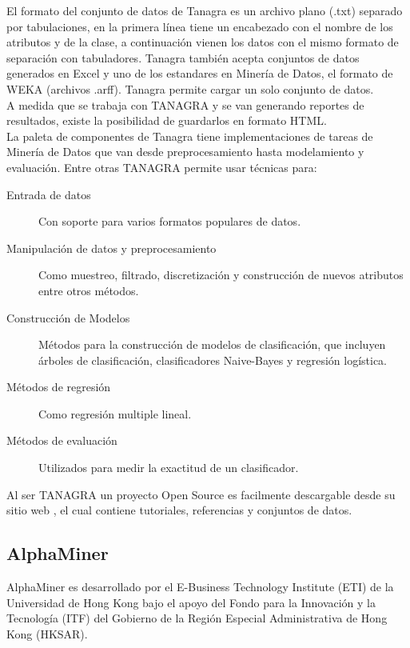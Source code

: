 El formato del conjunto de datos de Tanagra es un archivo plano (.txt) separado por tabulaciones, en la primera
l\'inea tiene un encabezado con el nombre de los atributos y de la clase, a continuaci\'on vienen los datos con
el mismo formato de separaci\'on con tabuladores. Tanagra tambi\'en acepta conjuntos de datos generados en Excel
y uno de los estandares en Miner\'ia de Datos, el formato de WEKA (archivos .arff). Tanagra permite cargar un
solo conjunto de datos.\\

A medida que se trabaja con TANAGRA y se van generando reportes de resultados, existe la posibilidad de
guardarlos en formato HTML.\\

La paleta de componentes de Tanagra tiene implementaciones de tareas de Miner\'ia de Datos que van desde
preprocesamiento hasta modelamiento y evaluaci\'on. Entre otras TANAGRA permite usar t\'ecnicas para:

\begin{description}
\item [Entrada de datos] Con soporte para varios formatos populares de datos.
\item [Manipulaci\'on de datos y preprocesamiento] Como muestreo, filtrado, discretizaci\'on y construcci\'on de nuevos atributos entre otros m\'etodos.
\item [Construcci\'on de Modelos] M\'etodos para la construcci\'on de modelos de clasificaci\'on, que incluyen \'arboles de clasificaci\'on, clasificadores Naive-Bayes y regresi\'on log\'istica.
\item [M\'etodos de regresi\'on] Como regresi\'on multiple lineal.
\item [M\'etodos de evaluaci\'on] Utilizados para medir la exactitud de un clasificador.
\end{description}

Al ser TANAGRA un proyecto Open Source es facilmente descargable desde su sitio web \cite{tana}, el cual contiene
tutoriales, referencias y conjuntos de datos.

\subsection{AlphaMiner}

AlphaMiner es desarrollado por el E-Business Technology Institute (ETI) de la Universidad de Hong Kong \cite{eti}
bajo el apoyo del Fondo para la Innovaci\'on y la Tecnolog\'ia (ITF) \cite{itf} del Gobierno de la Regi\'on
Especial Admi\-nistrativa de Hong Kong (HKSAR).\\

